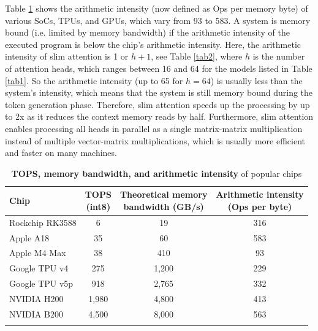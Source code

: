 \documentclass{article}
\def\fline{\Xhline{2\arrayrulewidth}} %
\begin{document}
Table \ref{tab3} shows the arithmetic intensity (now defined as Ops per memory byte) of various SoCs, TPUs, and GPUs, which vary from 93 to 583. A system is memory bound (i.e. limited by memory bandwidth) if the arithmetic intensity of the executed program is below the chip’s arithmetic intensity. Here, the arithmetic intensity of slim attention is 1 or $h + 1$, see Table \ref{tab2}, where $h$ is the number of attention heads, which ranges between 16 and 64 for the models listed in Table \ref{tab1}. So the arithmetic intensity (up to 65 for $h = 64$) is usually less than the system’s intensity, which means that the system is still memory bound during the token generation phase. Therefore, slim attention speeds up the processing by up to 2x as it reduces the context memory reads by half. Furthermore, slim attention enables processing all heads in parallel as a single matrix-matrix multiplication instead of multiple vector-matrix multiplications, which is usually more efficient and faster on many machines.
\begingroup \renewcommand{\arraystretch}{1.3} %
\begin{table}[h!] \centering
\caption{\textbf{TOPS, memory bandwidth, and arithmetic intensity} of popular chips}
\begin{tabular}{lccc} \fline
  Chip & \makecell{TOPS \\ (int8)} & \makecell{Theoretical memory \\ bandwidth (GB/s)} & \makecell{Arithmetic intensity \\ (Ops per byte)} \\ \hline
  Rockchip RK3588 & 6         & 19      & 316 \\
  Apple A18 \citep{apple-wiki}       & 35        & 60      & 583 \\
  Apple M4 Max \citep{apple-wiki}    & 38        & 410     & 93  \\
  Google TPU v4 \citep{TPU-wiki}  & 275       & 1,200   & 229 \\
  Google TPU v5p \citep{TPU-wiki}  & 918       & 2,765   & 332 \\
  NVIDIA H200  \citep{nvidia-wiki}   & 1,980     & 4,800   & 413 \\
  NVIDIA B200 \citep{nvidia-wiki}    & 4,500     & 8,000   & 563 \\ \fline
\end{tabular} \label{tab3} \end{table} \endgroup
\end{document}
